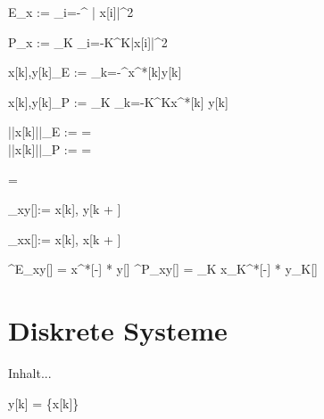 \begin{abox}
	E_x := \sum_{i=-\infty}^{\infty} | x[i]|^2
\end{abox}

\begin{abox}
	P_x :=  \lim\limits_{K \to \infty}\sum_{i=-K}^{K}|x[i]|^2
\end{abox}

\begin{abox}
	\langle x[k],y[k]\rangle_E := \sum_{k=-\infty}^{\infty}x^*[k]\cdot y[k]
\end{abox}

\begin{abox}
	\langle x[k],y[k]\rangle_P := \lim\limits_{K \to \infty}  \sum_{k=-K}^{K}x^*[k] \cdot y[k]
\end{abox}

\begin{abox}
	||x[k]||_E :=  =  \\
	||x[k]||_P :=  = 
\end{abox}

\begin{abox}
	\cos\Phi = 
\end{abox}

\begin{abox}
	\varphi_{xy}[\kappa]:= \langle x[k], y[k + \kappa] \rangle
\end{abox}

\begin{abox}
	\varphi_{xx}[\kappa]:= \langle x[k], x[k + \kappa] \rangle
\end{abox}

\begin{abox}
	\varphi^E_{xy}[\kappa] = x^*[-\kappa] * y[\kappa]  \varphi^P_{xy}[\kappa] = \lim\limits_{K \to \infty}  x_K^*[-\kappa] * y_K[\kappa]
\end{abox}

\chapter{Diskrete Systeme}

\setcounter{BoxCounter}{57}
\begin{abox}
	Inhalt...
\end{abox}

\begin{abox}
	y[k] = \{x[k]\}
\end{abox}

